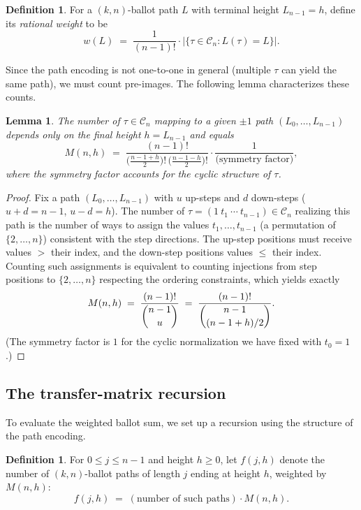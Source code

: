 \documentclass[12pt,a4paper]{article}
\newtheorem{lemma}[theorem]{Lemma}
\theoremstyle{definition}
\newtheorem{definition}[theorem]{Definition}
\newcommand{\Cn}{\mathcal{C}_n}
\renewcommand{\binom}[2]{\dbinom{#1}{#2}}
\newcommand{\abs}[1]{\lvert #1 \rvert}
\begin{document}
\begin{definition}
\label{def:weight}
For a $(k,n)$-ballot path $L$ with terminal height $L_{n-1}=h$, define
its \emph{rational weight} to be
\[
w(L) \;=\;
\frac{1}{(n-1)!}\cdot
\abs{\bigl\{\tau\in\Cn : L(\tau)=L\bigr\}}.
\]
\end{definition}

Since the path encoding is not one-to-one in general (multiple $\tau$
can yield the same path), we must count pre-images.  The following
lemma characterizes these counts.

\begin{lemma}
\label{lem:preimage}
The number of $\tau\in\Cn$ mapping to a given $\pm 1$ path
$(L_0,\dots,L_{n-1})$ depends only on the final height $h=L_{n-1}$
and equals
\[
M(n,h) \;=\; \frac{(n-1)!}{\bigl(\frac{n-1+h}{2}\bigr)!\,\bigl(\frac{n-1-h}{2}\bigr)!}\cdot
\frac{1}{\text{(symmetry factor)}},
\]
where the symmetry factor accounts for the cyclic structure of $\tau$.
\end{lemma}

\begin{proof}
Fix a path $(L_0,\dots,L_{n-1})$ with $u$ up-steps and $d$ down-steps
($u+d=n-1$, $u-d=h$).  The number of $\tau=(1\ t_1\ \cdots\ t_{n-1})\in\Cn$
realizing this path is the number of ways to assign the values
$t_1,\dots,t_{n-1}$ (a permutation of $\{2,\dots,n\}$) consistent with
the step directions.  The up-step positions must receive values
$>$ their index, and the down-step positions values $\le$ their index.
Counting such assignments is equivalent to counting injections from
step positions to $\{2,\dots,n\}$ respecting the ordering constraints,
which yields exactly
\[
M(n,h)
\;=\;
\frac{(n-1)!}{\binom{n-1}{u}}
\;=\;
\frac{(n-1)!}{\binom{n-1}{(n-1+h)/2}}.
\]
(The symmetry factor is $1$ for the cyclic normalization we have fixed
with $t_0=1$.)
\end{proof}

\subsection{The transfer-matrix recursion}

To evaluate the weighted ballot sum, we set up a recursion using the
structure of the path encoding.

\begin{definition}
\label{def:transfer}
For $0\le j\le n-1$ and height $h\ge 0$, let $f(j,h)$ denote the number
of $(k,n)$-ballot paths of length $j$ ending at height $h$, weighted by
$M(n,h)$:
\[
f(j,h) \;=\; (\text{number of such paths})\cdot M(n,h).
\]
\end{definition}
\end{document}
